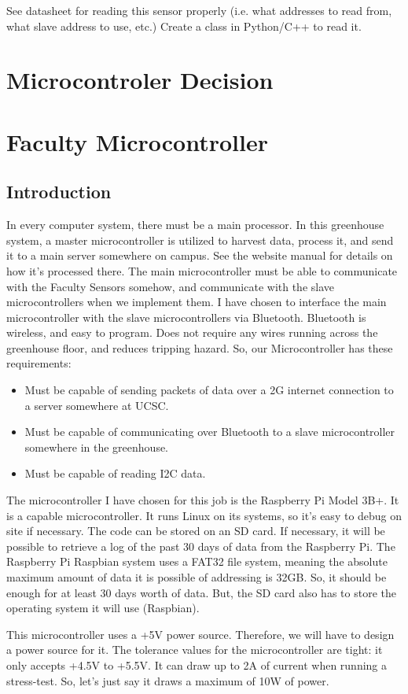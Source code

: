 See datasheet for reading this sensor properly (i.e. what  addresses to read from, what slave address to use, etc.)
Create a class in Python/C++ to read it.

\section{Microcontroler Decision}


\section{Faculty Microcontroller}

\subsection{Introduction}
In every computer system, there must be a main processor. In this greenhouse system, a master microcontroller is utilized to harvest data, process it, and send it to a main server somewhere on campus. See the website manual for details on how it’s processed there. The main microcontroller must be able to communicate with the Faculty Sensors somehow, and communicate with the slave microcontrollers when we implement them. I have chosen to interface the main microcontroller with the slave microcontrollers via Bluetooth. Bluetooth is wireless, and easy to program. Does not require any wires running across the greenhouse floor, and reduces tripping hazard. So, our Microcontroller  has these requirements:
\begin{itemize}
	\item Must be capable of sending packets of data over a 2G internet connection to a server somewhere at UCSC.
	\item Must be capable of communicating over Bluetooth to a slave microcontroller somewhere in the greenhouse.
	\item Must be capable of reading I2C data.
\end{itemize}

\par
The microcontroller I have chosen for this job is the Raspberry Pi Model 3B+. It is a capable microcontroller. It runs Linux on its systems, so it’s easy to debug on site if necessary. The code can be stored on an SD card. If necessary, it will be possible to retrieve a log of the past 30 days of data from the Raspberry Pi. The Raspberry Pi Raspbian system uses a FAT32 file system, meaning the absolute maximum amount of data it is possible of addressing is 32GB. So, it should be enough for at least 30 days worth of data. But, the SD card also has to store the operating system it will use (Raspbian). 
\par
This microcontroller uses a +5V power source. Therefore, we will have to design a power source for it. The tolerance values for the microcontroller are tight: it only accepts +4.5V to +5.5V. It can draw up to 2A of current when running a stress-test. So, let’s just say it draws a maximum of 10W of power.

